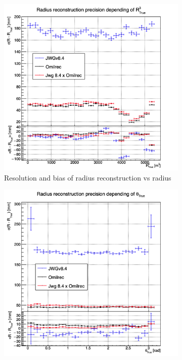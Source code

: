 \documentclass[../main.tex]{subfiles}
\begin{document}
\begin{figure}[ht]
  \begin{subfigure}[t]{0.32\linewidth}
    \centering
    \includegraphics[width=\linewidth]{images/jgnn/MSBvRT.png}
    \caption{Resolution and bias of radius reconstruction vs radius}
    \label{fig:jgnn:MSBvRTC}
  \end{subfigure}
  \begin{subfigure}[t]{0.32\linewidth}
    \centering
    \includegraphics[width=\linewidth]{images/jgnn/MSBvTT.png}

\end{subfigure}
\end{figure}
\end{document}
